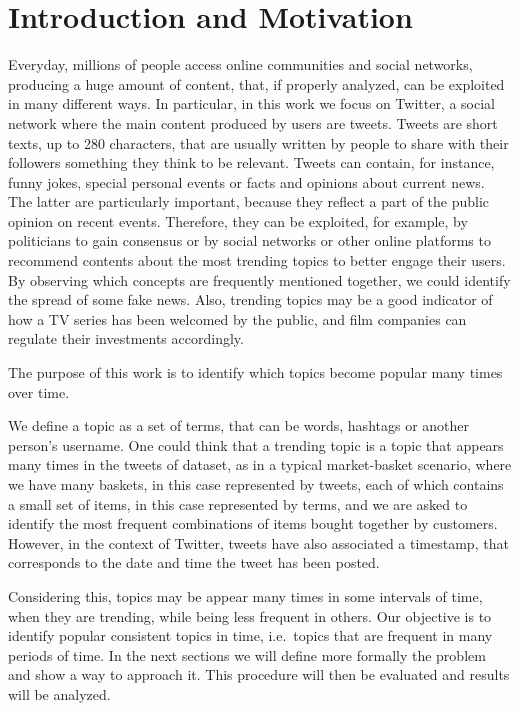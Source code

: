 \section{Introduction and Motivation}
\label{sec:intro}
Everyday, millions of people access online communities and social networks, producing 
a huge amount of content, that, if properly analyzed, can be exploited in many different ways.
In particular, in this work we focus on Twitter, a social network where the main 
content produced by users are tweets. Tweets are short texts, up to 280 characters,
that are usually written by people to share with their followers something they think to be 
relevant. Tweets can contain, for instance, funny jokes, special personal events or facts
and opinions about current news. The latter are particularly important,
because they reflect a part of the public opinion on recent events.
Therefore, they can be exploited, for example, 
by politicians to gain consensus or by social networks or other online platforms to 
recommend contents about the most trending topics to better engage their users.
By observing which concepts are frequently mentioned together, we could 
identify the spread of some fake news. Also, trending topics 
may be a good indicator of how a TV series has been welcomed by the public, and 
film companies can regulate their investments accordingly.

The purpose of this work is to identify which topics become popular many times 
over time.

We define a topic as a set of terms, that can be words, hashtags
or another person's username. 
One could think that a trending 
topic is a topic that appears many times in the tweets of dataset, as in a typical 
market-basket scenario, where we have many baskets, in this case represented by 
tweets, each of which contains a small set of items, in this case represented by terms,
and we are asked to identify the most frequent combinations of items bought together by
customers.
However, in the context of Twitter, tweets have also associated a timestamp, 
that corresponds to the date and time the tweet has been posted. 

Considering this, topics may be appear many times in some intervals of time, 
when they are trending, while being less frequent in others. 
Our objective is to identify popular consistent topics in time, i.e.\ topics that 
are frequent in many periods of time.
In the next sections we will define more formally the problem 
and show a way to approach it. This procedure will then be evaluated and results will 
be analyzed.



